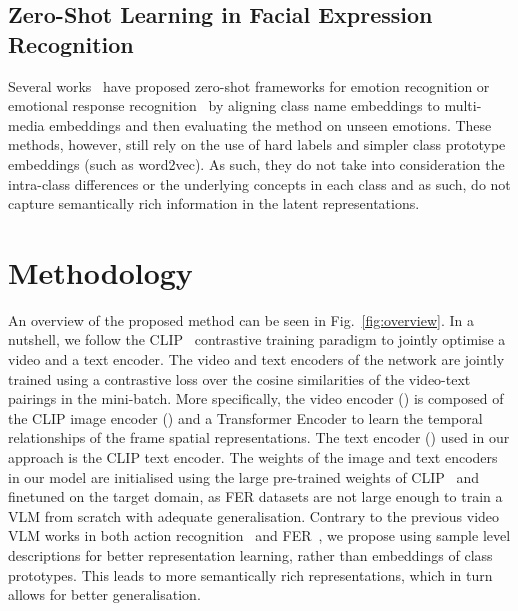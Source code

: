 \documentclass[10pt,twocolumn,letterpaper]{article}
\begin{document}
\subsection{Zero-Shot Learning in Facial Expression Recognition}

Several works~\cite{banerjee_learning_2022, qi_zero-shot_2021, xu_exploring_2022, xu2023zero} have proposed zero-shot frameworks for emotion recognition or emotional response recognition~\cite{zhan_zero-shot_2019} by aligning class name embeddings to multi-media embeddings and then evaluating the method on unseen emotions. These methods, however, still rely on the use of hard labels and simpler class prototype embeddings (such as word2vec). As such, they do not take into consideration the intra-class differences or the underlying concepts in each class and as such, do not capture semantically rich information in the latent representations.



\section{Methodology}
\label{sec:method}



An overview of the proposed method can be seen in Fig.~\ref{fig:overview}. In a nutshell, we follow the  CLIP~\cite{radford_CLIP_2021}  contrastive training paradigm to jointly optimise a video and a text encoder. The video and text encoders of the network are jointly trained using a contrastive loss over the cosine similarities of the video-text pairings in the mini-batch. 
More specifically, the video encoder () is composed of the CLIP image encoder () and a Transformer Encoder to learn the temporal relationships of the frame spatial representations. The text encoder () used in our approach is the CLIP text encoder. The weights of the image and text encoders in our model are initialised using the large pre-trained weights of CLIP~\cite{radford_CLIP_2021} and finetuned on the target domain, as FER datasets are not large enough to train a VLM from scratch with adequate generalisation. Contrary to the previous video VLM works in both action recognition~\cite{wang_actionclip_2021, lin_frozen_2022} and FER~\cite{li_cliper_2023, li_fer-former_2023}, we propose using sample level descriptions for better representation learning, rather than embeddings of class prototypes. This leads to more semantically rich representations, which in turn allows for better generalisation. 
\end{document}
